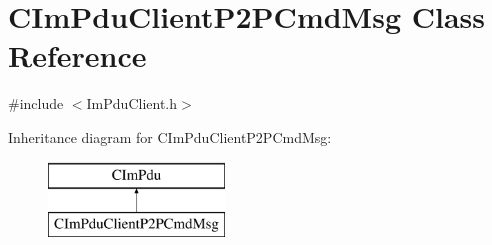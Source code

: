 \hypertarget{class_c_im_pdu_client_p2_p_cmd_msg}{}\section{C\+Im\+Pdu\+Client\+P2\+P\+Cmd\+Msg Class Reference}
\label{class_c_im_pdu_client_p2_p_cmd_msg}


{\ttfamily \#include $<$Im\+Pdu\+Client.\+h$>$}

Inheritance diagram for C\+Im\+Pdu\+Client\+P2\+P\+Cmd\+Msg\+:\begin{figure}[H]
\begin{center}
\leavevmode
\includegraphics[height=2.000000cm]{class_c_im_pdu_client_p2_p_cmd_msg}
\end{center}
\end{figure}
